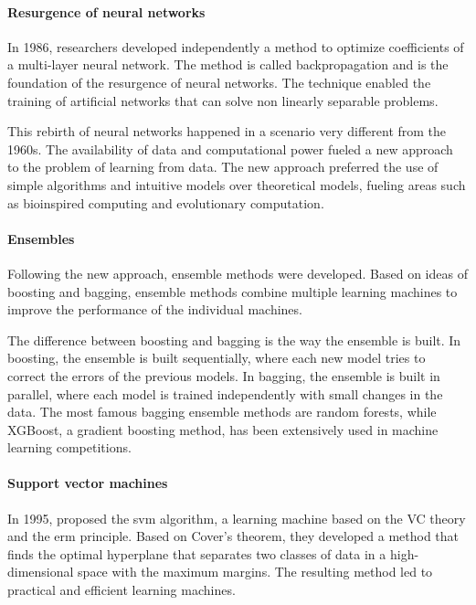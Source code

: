 \paragraph{Resurgence of neural networks}

In 1986, researchers developed independently a method to optimize coefficients of a
multi-layer neural
network.  The method is called backpropagation and
is the foundation of the resurgence of neural networks.  The technique enabled the
training of artificial networks that can solve non linearly separable problems.

This rebirth of neural networks happened in a scenario very different from the 1960s.
The availability of data and computational power fueled a new approach to the problem of
learning from data.  The new approach preferred the use of simple algorithms and
intuitive models over theoretical models, fueling areas such as bioinspired computing and
evolutionary computation.

\paragraph{Ensembles}

Following the new approach, ensemble methods were developed.  Based on ideas of
boosting and bagging, ensemble
methods combine multiple learning machines to improve the performance of the individual
machines.

The difference between boosting and bagging is the way the ensemble is built.  In
boosting, the ensemble is built sequentially, where each new model tries to correct the
errors of the previous models.  In bagging, the ensemble is built in parallel, where each
model is trained independently with small changes in the data.  The most famous bagging
ensemble methods are random forests, while XGBoost, a gradient
boosting method, has been extensively used in machine learning
competitions.

\paragraph{Support vector machines}

In 1995, \citeauthor{Cortes1995} proposed the \gls{svm} algorithm, a
learning machine based on the VC theory and the \gls{erm} principle.  Based on Cover's
theorem, they developed a method that finds the optimal hyperplane
that separates two classes of data in a high-dimensional space with the maximum margins.
The resulting method led to practical and efficient learning machines.

